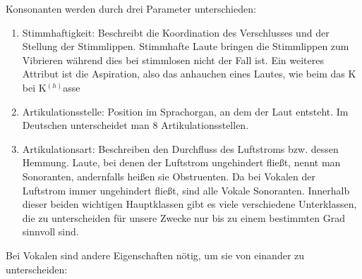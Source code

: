 Konsonanten werden durch drei Parameter unterschieden:
\begin{enumerate}

\item Stimmhaftigkeit: Beschreibt die Koordination des Verschlusses und der Stellung der Stimmlippen. Stimmhafte Laute bringen die Stimmlippen zum Vibrieren während dies bei stimmlosen nicht der Fall ist. Ein weiteres Attribut ist die Aspiration, also das anhauchen eines Lautes, wie beim das K bei K$^{(h)}$asse \cite[S.~5,~19ff]{Hall2011}

\item Artikulationsstelle: Position im Sprachorgan, an dem der Laut entsteht. Im Deutschen unterscheidet man 8 Artikulationsstellen.\cite[S.~6,~32]{Hall2011}

\item Artikulationsart: Beschreiben den Durchfluss des Luftstroms bzw. dessen Hemmung. Laute, bei denen der Luftstrom ungehindert fließt, nennt man Sonoranten, andernfalls heißen sie Obstruenten. Da bei Vokalen der Luftstrom immer ungehindert fließt, sind alle Vokale Sonoranten. Innerhalb dieser beiden wichtigen Hauptklassen gibt es viele verschiedene Unterklassen, die zu unterscheiden für unsere Zwecke nur bis zu einem bestimmten Grad sinnvoll sind. \cite[S.~9ff,~22f]{Hall2011}

\end{enumerate}

Bei Vokalen sind andere Eigenschaften nötig, um sie von einander zu unterscheiden:

